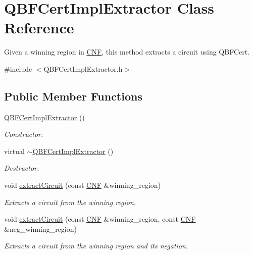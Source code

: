 \hypertarget{classQBFCertImplExtractor}{\section{Q\-B\-F\-Cert\-Impl\-Extractor Class Reference}
\label{classQBFCertImplExtractor}
}


Given a winning region in \hyperlink{classCNF}{C\-N\-F}, this method extracts a circuit using Q\-B\-F\-Cert.  




{\ttfamily \#include $<$Q\-B\-F\-Cert\-Impl\-Extractor.\-h$>$}

\subsection*{Public Member Functions}
\begin{DoxyCompactItemize}
\item 
\hyperlink{classQBFCertImplExtractor_a1775a11abdad2797b0f7e7e1105bfb2b}{Q\-B\-F\-Cert\-Impl\-Extractor} ()
\begin{DoxyCompactList}\small\item\em Constructor. \end{DoxyCompactList}\item 
virtual \hyperlink{classQBFCertImplExtractor_a52dfc285e9b75484e500b21ff4c35919}{$\sim$\-Q\-B\-F\-Cert\-Impl\-Extractor} ()
\begin{DoxyCompactList}\small\item\em Destructor. \end{DoxyCompactList}\item 
void \hyperlink{classQBFCertImplExtractor_a3ff8c8d92df6d7ed01fe193ca880c14e}{extract\-Circuit} (const \hyperlink{classCNF}{C\-N\-F} \&winning\-\_\-region)
\begin{DoxyCompactList}\small\item\em Extracts a circuit from the winning region. \end{DoxyCompactList}\item 
void \hyperlink{classQBFCertImplExtractor_a47577070a52f5d95b194a863e6b86893}{extract\-Circuit} (const \hyperlink{classCNF}{C\-N\-F} \&winning\-\_\-region, const \hyperlink{classCNF}{C\-N\-F} \&neg\-\_\-winning\-\_\-region)
\begin{DoxyCompactList}\small\item\em Extracts a circuit from the winning region and its negation. \end{DoxyCompactList}\end{DoxyCompactItemize}
